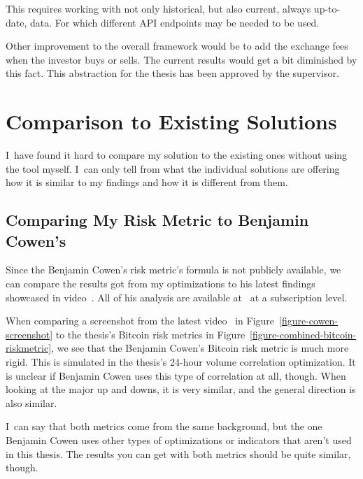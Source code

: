 This requires working with not only historical, but also current, always up-to-date, data. For which different API endpoints may be needed to be used.

Other improvement to the overall framework would be to add the exchange fees when the investor buys or sells. The current results would get a bit diminished by this fact. This abstraction for the thesis has been approved by the supervisor.

\section{Comparison to Existing Solutions}
I~have found it hard to compare my solution to the existing ones without using the tool myself. I~can only tell from what the individual solutions are offering how it is similar to my findings and how it is different from them.

\subsection*{Comparing My Risk Metric to Benjamin Cowen's}
Since the Benjamin Cowen's risk metric's formula is not publicly available, we can compare the results got from my optimizations to his latest findings showcased in video~\cite{youtube:bitcoin-risk-metric-latest}. All of his analysis are available at~\cite{intothecryptoverse} at a subscription level.

When comparing a screenshot from the latest video~\cite{youtube:bitcoin-risk-metric-latest} in Figure~\ref{figure-cowen-screenshot} to the thesis's Bitcoin risk metrics in Figure~\ref{figure-combined-bitcoin-riskmetric}, we see that the Benjamin Cowen's Bitcoin risk metric is much more rigid. This is simulated in the thesis's 24-hour volume correlation optimization. It is unclear if Benjamin Cowen uses this type of correlation at all, though. When looking at the major up and downs, it is very similar, and the general direction is also similar.

I~can say that both metrics come from the same background, but the one Benjamin Cowen uses other types of optimizations or indicators that aren't used in this thesis. The results you can get with both metrics should be quite similar, though.


